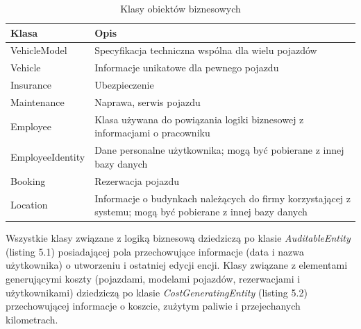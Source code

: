 \documentclass[eng,printmode,openany]{mgr}
\begin{document}
	\newpage
	\begin{table}[H]
		\caption{Klasy obiektów biznesowych}
		\begin{tabularx}{\textwidth}{|l|X|}
			\hline
			\textbf{Klasa}   & \textbf{Opis}                                                                                              \\ \hline
			VehicleModel     & Specyfikacja techniczna wspólna dla wielu pojazdów                                                         \\ \hline
			Vehicle          & Informacje unikatowe dla pewnego pojazdu                                                                   \\ \hline
			Insurance        & Ubezpieczenie                                                                                              \\ \hline
			Maintenance      & Naprawa, serwis pojazdu                                                                                    \\ \hline
			Employee         & Klasa używana do powiązania logiki biznesowej z informacjami o pracowniku                                  \\ \hline
			EmployeeIdentity & Dane personalne użytkownika; mogą być pobierane z innej bazy danych                                        \\ \hline
			Booking          & Rezerwacja pojazdu                                                                                         \\ \hline
			Location         & Informacje o budynkach należących do firmy korzystającej z systemu; mogą być pobierane z innej bazy danych \\ \hline
		\end{tabularx}
	\end{table}
	
	Wszystkie klasy związane z logiką biznesową dziedziczą po klasie \textit{AuditableEntity} (listing 5.1) posiadającej pola przechowujące informacje (data i nazwa użytkownika) o utworzeniu i ostatniej edycji encji. Klasy związane z elementami generującymi koszty (pojazdami, modelami pojazdów, rezerwacjami i użytkownikami) dziedziczą po klasie \newline \textit{CostGeneratingEntity} (listing 5.2) przechowującej informacje o koszcie, zużytym paliwie i przejechanych kilometrach.
	
	
\end{document}
